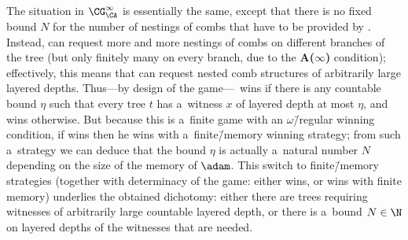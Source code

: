 \documentclass{lmcs}
\numberwithin{equation}{section}
\numberwithin{figure}{section}
\newcommand{\itemfont}[1]{\textbf{#1}}
\begin{document}
The situation in $\CG^\infty_\CA$ is essentially the same, except that there is no fixed bound $N$ for the number of nestings of combs that have to be provided by \eve.
Instead, \adam can request more and more nestings of combs on different branches of the tree (but only finitely many on every branch, due to the \itemfont{A($\infty$)} condition);
effectively, this means that \adam can request nested comb structures of arbitrarily large layered depths.
Thus---by design of the game---\adam~wins if there is any countable bound $\eta$ such that every tree $t$ has a~witness $x$ of layered depth at most $\eta$, and \eve wins otherwise.
But because this is a~finite game with an $\omega$\=/regular winning condition, if \adam wins then he wins with a~finite\=/memory winning strategy;
from such a~strategy we can deduce that the bound $\eta$ is actually a~natural number $N$ depending on the size of the memory of $\adam$.
This switch to finite\=/memory strategies (together with determinacy of the game: either \eve wins, or \adam wins with finite memory) underlies the obtained dichotomy:
either there are trees requiring witnesses of arbitrarily large countable layered depth, or there is a~bound $N\in\N$ on layered depths of the witnesses that are needed.
\end{document}
